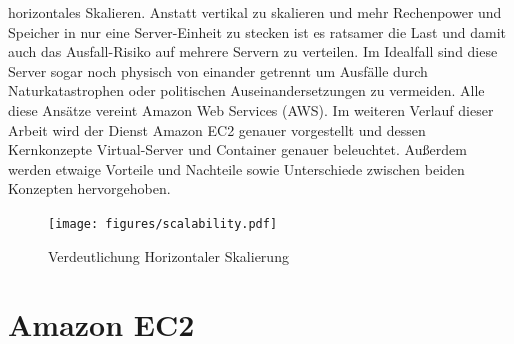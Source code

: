 \documentclass[titlepage]{report}
\begin{document}
horizontales Skalieren. Anstatt vertikal zu skalieren und mehr
Rechenpower und Speicher in nur eine Server\hyp{}Einheit zu stecken ist es
ratsamer die Last und damit auch das Ausfall\hyp{}Risiko auf mehrere Servern
zu verteilen. Im Idealfall sind diese Server sogar noch physisch von
einander getrennt um Ausfälle durch Naturkatastrophen oder politischen
Auseinandersetzungen zu vermeiden.  Alle diese Ansätze vereint Amazon
Web Services (AWS). Im weiteren Verlauf dieser Arbeit wird der Dienst
Amazon EC2 genauer vorgestellt und dessen Kernkonzepte Virtual\hyp{}Server
und Container genauer beleuchtet. Außerdem werden etwaige Vorteile und
Nachteile sowie Unterschiede zwischen beiden Konzepten hervorgehoben.
\begin{figure}[h]
    \centering
    \texttt{[image: figures/scalability.pdf]}
    \caption{Verdeutlichung Horizontaler Skalierung}\label{fig:1}
\end{figure}
\chapter*{Amazon EC2}
\end{document}
